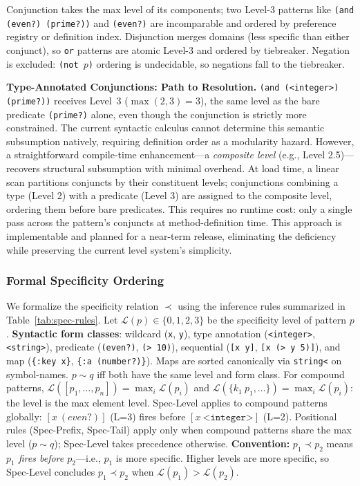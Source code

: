 \documentclass[sigconf,nonacm]{acmart}
\begin{document}
Conjunction takes the max level of its components; two Level-3 patterns like \texttt{(and (even?) (prime?))} and \texttt{(even?)} are incomparable and ordered by preference registry or definition index.
Disjunction merges domains (less specific than either conjunct), so \texttt{or} patterns are atomic Level-3 and ordered by tiebreaker.
Negation is excluded: \texttt{(not $p$)} ordering is undecidable, so negations fall to the tiebreaker.

\textbf{Type-Annotated Conjunctions: Path to Resolution.}
\texttt{(and (<integer>) (prime?))} receives Level~3 ($\max(2,3) = 3$), the same level as the bare
predicate \texttt{(prime?)} alone, even though the conjunction is strictly more constrained.
The current syntactic calculus cannot determine this semantic subsumption natively, requiring definition order as a modularity hazard.
However, a straightforward compile-time enhancement---a \emph{composite level} (e.g., Level 2.5)---recovers structural subsumption with minimal overhead.
At load time, a linear scan partitions conjuncts by their constituent levels; conjunctions combining a type (Level 2) with a predicate (Level 3) are assigned to the composite level, ordering them before bare predicates.
This requires no runtime cost: only a single pass across the pattern's conjuncts at method-definition time.
This approach is implementable and planned for a near-term release, eliminating the deficiency while preserving the current level system's simplicity.

\subsubsection{Formal Specificity Ordering}
We formalize the specificity relation $\prec$ using the inference rules summarized in Table~\ref{tab:spec-rules}.
Let $\mathcal{L}(p) \in \{0, 1, 2, 3\}$ be the specificity level of pattern $p$.
\textbf{Syntactic form classes}: wildcard (\texttt{x}, \texttt{y}), type annotation (\texttt{<integer>}, \texttt{<string>}), predicate (\texttt{(even?)}, \texttt{(> 10)}), sequential (\texttt{[x y]}, \texttt{[x (> y 5)]}), and map (\texttt{\{:key x\}}, \texttt{\{:a (number?)\}}).
Maps are sorted canonically via \texttt{string<} on symbol-names. $p \sim q$ iff both have the same level and form class.
For compound patterns, $\mathcal{L}([p_1, \dots, p_n]) = \max_i \mathcal{L}(p_i)$ and $\mathcal{L}(\{k_1~p_1, \dots\}) = \max_i \mathcal{L}(p_i)$: the level is the max element level.
Spec-Level applies to compound patterns globally: $[x~(even?)]$ (L=3) fires before $[x~\mathtt{\mbox{<integer>}}]$ (L=2).
Positional rules (Spec-Prefix, Spec-Tail) apply only when compound patterns share the max level ($p \sim q$); Spec-Level takes precedence otherwise.
\textbf{Convention:} $p_1 \prec p_2$ means \emph{$p_1$ fires before $p_2$}---i.e., $p_1$ is more specific.
Higher levels are more specific, so Spec-Level concludes $p_1 \prec p_2$ when $\mathcal{L}(p_1) > \mathcal{L}(p_2)$.
\end{document}
